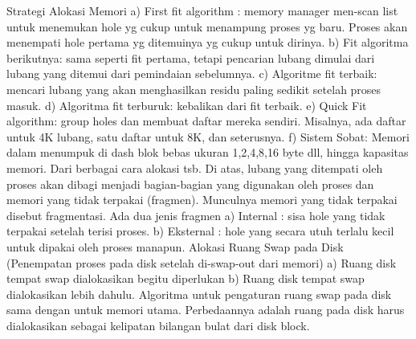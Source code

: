 Strategi Alokasi Memori
a) First fit algorithm : memory  manager men-scan list untuk  menemukan hole yg cukup untuk menampung proses yg baru. Proses akan menempati hole pertama yg ditemuinya yg cukup untuk dirinya.
b) Fit algoritma berikutnya: sama seperti fit pertama, tetapi pencarian lubang dimulai dari lubang yang ditemui dari pemindaian sebelumnya.
c) Algoritme fit terbaik: mencari lubang yang akan menghasilkan residu paling sedikit setelah proses masuk.
d) Algoritma fit terburuk: kebalikan dari fit terbaik.
e) Quick Fit algorithm: group holes dan membuat daftar mereka sendiri. Misalnya, ada daftar untuk 4K lubang, satu daftar untuk 8K, dan seterusnya.
f) Sistem Sobat: Memori dalam menumpuk di dash blok bebas ukuran 1,2,4,8,16 byte dll, hingga kapasitas memori.
Dari berbagai cara alokasi tsb. Di atas, lubang yang ditempati oleh proses akan dibagi menjadi bagian-bagian yang digunakan oleh proses dan memori yang tidak terpakai (fragmen). Munculnya memori yang tidak terpakai disebut fragmentasi. Ada dua jenis fragmen
a)      Internal : sisa hole yang tidak terpakai setelah terisi proses.
b)      Eksternal : hole yang secara utuh terlalu kecil untuk dipakai oleh proses manapun.
Alokasi Ruang Swap pada Disk (Penempatan proses pada disk setelah di-swap-out dari memori)
a)      Ruang disk tempat swap dialokasikan begitu diperlukan
b)      Ruang disk tempat swap dialokasikan lebih dahulu.
Algoritma untuk pengaturan ruang swap pada disk sama dengan  untuk memori utama. Perbedaannya adalah ruang pada disk harus dialokasikan sebagai kelipatan bilangan bulat dari disk block.

